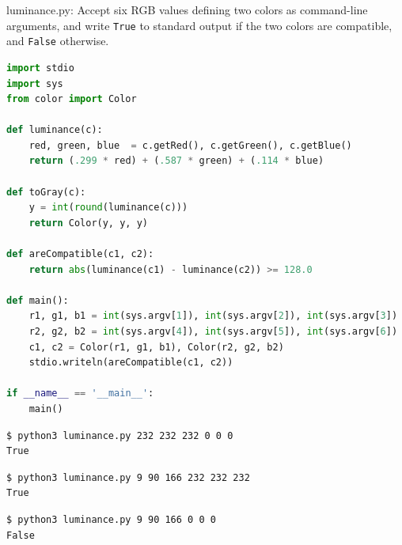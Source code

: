 \documentclass[8pt,a4paper,compress]{beamer}
\begin{document}
\begin{frame}[fragile]
\pause

\begin{framed}
\tiny luminance.py: Accept six RGB values defining two colors as command-line arguments, and write \lstinline{True} to standard output if the two colors are compatible, and \lstinline{False} otherwise.
\end{framed}

\begin{lstlisting}[language=Python,style=focusin]
import stdio
import sys
from color import Color

def luminance(c):
    red, green, blue  = c.getRed(), c.getGreen(), c.getBlue()
    return (.299 * red) + (.587 * green) + (.114 * blue)

def toGray(c):
    y = int(round(luminance(c)))
    return Color(y, y, y)

def areCompatible(c1, c2):
    return abs(luminance(c1) - luminance(c2)) >= 128.0

def main():
    r1, g1, b1 = int(sys.argv[1]), int(sys.argv[2]), int(sys.argv[3])
    r2, g2, b2 = int(sys.argv[4]), int(sys.argv[5]), int(sys.argv[6])
    c1, c2 = Color(r1, g1, b1), Color(r2, g2, b2)
    stdio.writeln(areCompatible(c1, c2))

if __name__ == '__main__':
    main()
\end{lstlisting}

\pause
\bigskip

\begin{lstlisting}[language={},style=focusin]
$ python3 luminance.py 232 232 232 0 0 0
True
\end{lstlisting}

\pause
\smallskip

\begin{lstlisting}[language={},style=focusin]
$ python3 luminance.py 9 90 166 232 232 232
True
\end{lstlisting}

\pause
\smallskip

\begin{lstlisting}[language={},style=focusin]
$ python3 luminance.py 9 90 166 0 0 0
False
\end{lstlisting}
\end{frame}
\end{document}
